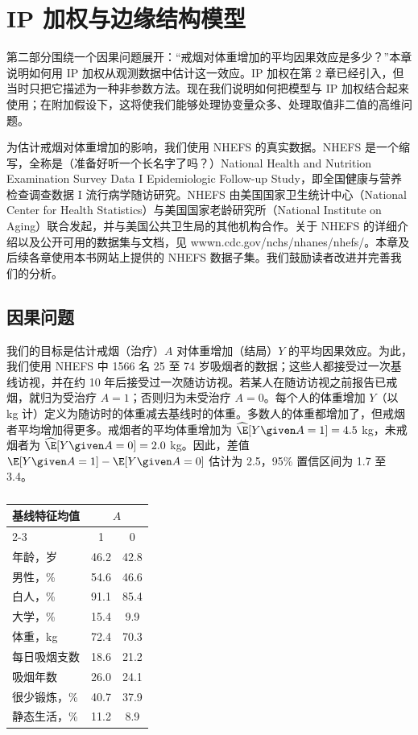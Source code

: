 \chapter[\hspace{0.6em}IP 加权与边缘结构模型]{IP 加权与边缘结构模型}

第二部分围绕一个因果问题展开：“戒烟对体重增加的平均因果效应是多少？”本章说明如何用 IP 加权从观测数据中估计这一效应。IP 加权在第 2 章已经引入，但当时只把它描述为一种非参数方法。现在我们说明如何把模型与 IP 加权结合起来使用；在附加假设下，这将使我们能够处理协变量众多、处理取值非二值的高维问题。

为估计戒烟对体重增加的影响，我们使用 NHEFS 的真实数据。NHEFS 是一个缩写，全称是（准备好听一个长名字了吗？）National Health and Nutrition Examination Survey Data I Epidemiologic Follow-up Study，即全国健康与营养检查调查数据 I 流行病学随访研究。NHEFS 由美国国家卫生统计中心（National Center for Health Statistics）与美国国家老龄研究所（National Institute on Aging）联合发起，并与美国公共卫生局的其他机构合作。关于 NHEFS 的详细介绍以及公开可用的数据集与文档，见 wwwn.cdc.gov/nchs/nhanes/nhefs/。本章及后续各章使用本书网站上提供的 NHEFS 数据子集。我们鼓励读者改进并完善我们的分析。

\section{因果问题}

我们的目标是估计戒烟（治疗）$A$ 对体重增加（结局）$Y$ 的平均因果效应。为此，我们使用 NHEFS 中 1566 名 25 至 74 岁吸烟者的数据；这些人都接受过一次基线访视，并在约 10 年后接受过一次随访访视。若某人在随访访视之前报告已戒烟，就归为受治疗 $A=1$；否则归为未受治疗 $A=0$。每个人的体重增加 $Y$（以 kg 计）定义为随访时的体重减去基线时的体重。多数人的体重都增加了，但戒烟者平均增加得更多。戒烟者的平均体重增加为 $\widehat{\E}[Y\given A=1]=4.5$ kg，未戒烟者为 $\widehat{\E}[Y\given A=0]=2.0$ kg。因此，差值 $\E[Y\given A=1]-\E[Y\given A=0]$ 估计为 2.5，95\% 置信区间为 1.7 至 3.4。

\begin{table}[htbp]
\centering
\caption{}
\label{tab:12.1}
\small
\begin{tabular}{lcc}
\toprule
基线特征均值 & \multicolumn{2}{c}{$A$}\\
\cmidrule(lr){2-3}
 & 1 & 0\\
\midrule
年龄，岁 & 46.2 & 42.8\\
男性，\% & 54.6 & 46.6\\
白人，\% & 91.1 & 85.4\\
大学，\% & 15.4 & 9.9\\
体重，kg & 72.4 & 70.3\\
每日吸烟支数 & 18.6 & 21.2\\
吸烟年数 & 26.0 & 24.1\\
很少锻炼，\% & 40.7 & 37.9\\
静态生活，\% & 11.2 & 8.9\\
\bottomrule
\end{tabular}
\end{table}

